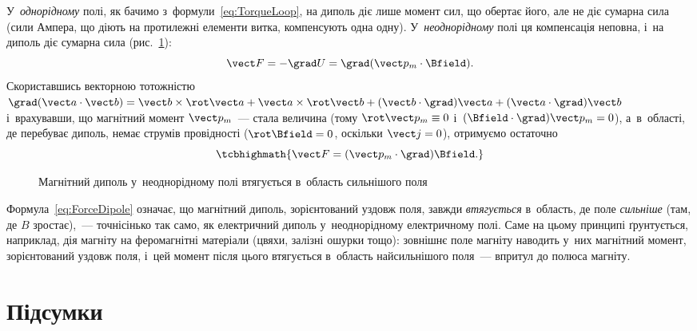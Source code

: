 У~\emph{однорідному} полі, як бачимо з~формули~\eqref{eq:TorqueLoop}, на диполь діє лише
момент сил, що обертає його, але не діє сумарна сила (сили Ампера, що діють на протилежні
елементи витка, компенсують одна одну). У~\emph{неоднорідному} полі ця компенсація
неповна, і~на диполь діє сумарна сила (рис.~\ref{pic:ForceDipole}):
\begin{equation*}
	\vect F = -\grad U = \grad(\vect p_m\cdot\Bfield).
\end{equation*}
Скориставшись векторною тотожністю $\grad(\vect a\cdot\vect b) = \vect b\times\rot\vect a
	+ \vect a\times\rot\vect b + (\vect b\cdot\grad)\vect a + (\vect a\cdot\grad)\vect b$
і~врахувавши, що магнітний момент $\vect p_m$~--- стала величина (тому $\rot\vect p_m
	\equiv 0$ і~$(\Bfield\cdot\grad)\vect p_m = 0$), а~в~області, де перебуває диполь, немає
струмів провідності ($\rot\Bfield = 0$, оскільки $\vect j=0$), отримуємо остаточно
\begin{equation}\label{eq:ForceDipole}
	\tcbhighmath{
		\vect F = (\vect p_m\cdot\grad)\Bfield.
	}
\end{equation}

\begin{figure}\centering
	\caption{Магнітний диполь у~неоднорідному полі втягується в~область сильнішого
		поля\label{pic:ForceDipole}}
\end{figure}

\begin{Attention}
	Формула~\eqref{eq:ForceDipole} означає, що магнітний диполь, зорієнтований уздовж
	поля, завжди \emph{втягується} в~область, де поле \emph{сильніше} (там, де $B$
	зростає),~--- точнісінько так само, як електричний диполь у~неоднорідному електричному
	полі. Саме на цьому принципі ґрунтується, наприклад, дія магніту на феромагнітні
	матеріали (цвяхи, залізні ошурки тощо): зовнішнє поле магніту наводить у~них магнітний
	момент, зорієнтований уздовж поля, і~цей момент після цього втягується в~область
	найсильнішого поля~--- впритул до полюса магніту.
\end{Attention}


\section*{Підсумки}


